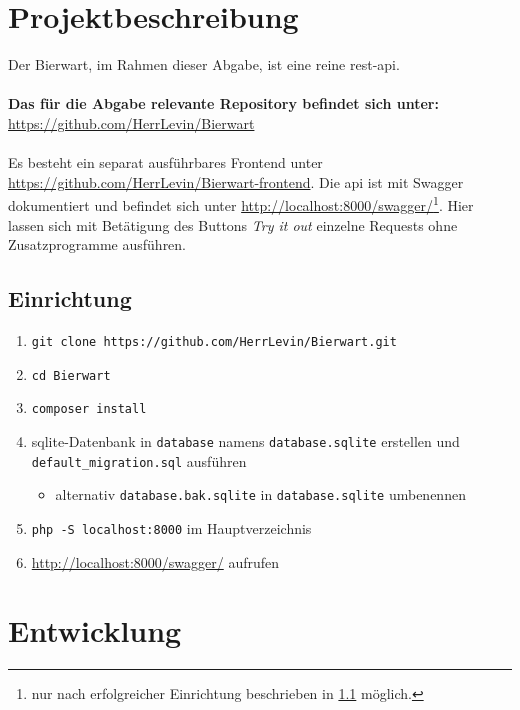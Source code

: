 \documentclass[12pt,a4paper,titlepage,ngerman,pdftex]{report}
\begin{document}
    \chapter{Projektbeschreibung}\label{ch:projektbeschreibung}
    Der Bierwart, im Rahmen dieser Abgabe, ist eine reine \ac{rest}-\ac{api}. \\ \\
    \textbf{Das für die Abgabe relevante Repository befindet sich unter:} \\ \url{https://github.com/HerrLevin/Bierwart}\\ \\
    Es besteht ein separat ausführbares Frontend unter \url{https://github.com/HerrLevin/Bierwart-frontend}.
    Die \ac{api} ist mit Swagger dokumentiert und befindet sich unter \url{http://localhost:8000/swagger/}\footnote{nur nach erfolgreicher Einrichtung beschrieben in \ref{sec:einrichtung} möglich.}.
    Hier lassen sich mit Betätigung des Buttons \textit{Try it out} einzelne Requests ohne Zusatzprogramme ausführen.


    \section{Einrichtung}\label{sec:einrichtung}

    \begin{enumerate}
        \item \texttt{git clone https://github.com/HerrLevin/Bierwart.git}
        \item \texttt{cd Bierwart}
        \item \texttt{composer install}
        \item sqlite-Datenbank in \texttt{database} namens \texttt{database.sqlite} erstellen und\\ \texttt{default\_migration.sql} ausführen
        \begin{itemize}
            \item alternativ \texttt{database.bak.sqlite} in \texttt{database.sqlite} umbenennen
        \end{itemize}
        \item \texttt{php -S localhost:8000} im Hauptverzeichnis
        \item \url{http://localhost:8000/swagger/} aufrufen
    \end{enumerate}


    \chapter{Entwicklung}\label{ch:entwicklung}
\end{document}
